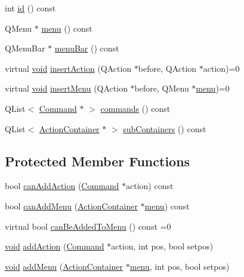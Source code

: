 \begin{DoxyCompactItemize}
\item 
int \hyperlink{group___core_plugin_ga394d3161befa5e1f84cf07253b21a536}{id} () const 
\item 
\-Q\-Menu $\ast$ \hyperlink{group___core_plugin_ga243949a2b2abff30862e34f6313f28c0}{menu} () const 
\item 
\-Q\-Menu\-Bar $\ast$ \hyperlink{group___core_plugin_gaf2d8e7b9ed6b98c22dd1eea1443737ce}{menu\-Bar} () const 
\item 
virtual \hyperlink{group___u_a_v_objects_plugin_ga444cf2ff3f0ecbe028adce838d373f5c}{void} \hyperlink{group___core_plugin_gac4252ea9deafe98c0e98946dfff78b4d}{insert\-Action} (\-Q\-Action $\ast$before, \-Q\-Action $\ast$action)=0
\item 
virtual \hyperlink{group___u_a_v_objects_plugin_ga444cf2ff3f0ecbe028adce838d373f5c}{void} \hyperlink{group___core_plugin_gacc8f86cfc70affa3f17dd0998c9e893b}{insert\-Menu} (\-Q\-Action $\ast$before, \-Q\-Menu $\ast$\hyperlink{group___core_plugin_ga243949a2b2abff30862e34f6313f28c0}{menu})=0
\item 
\-Q\-List$<$ \hyperlink{class_core_1_1_command}{\-Command} $\ast$ $>$ \hyperlink{group___core_plugin_gab3e0ff04d294ddefd25b8762d3e2f008}{commands} () const 
\item 
\-Q\-List$<$ \hyperlink{class_core_1_1_action_container}{\-Action\-Container} $\ast$ $>$ \hyperlink{group___core_plugin_ga63f59fe25c7e6fa20891fca2ee620f16}{sub\-Containers} () const 
\end{DoxyCompactItemize}
\subsection*{\-Protected \-Member \-Functions}
\begin{DoxyCompactItemize}
\item 
bool \hyperlink{group___core_plugin_ga506d6f367240b15d691c878fa0e9935d}{can\-Add\-Action} (\hyperlink{class_core_1_1_command}{\-Command} $\ast$action) const 
\item 
bool \hyperlink{group___core_plugin_gadbde4aa31f9950d994f21baf55bea0ae}{can\-Add\-Menu} (\hyperlink{class_core_1_1_action_container}{\-Action\-Container} $\ast$\hyperlink{group___core_plugin_ga243949a2b2abff30862e34f6313f28c0}{menu}) const 
\item 
virtual bool \hyperlink{group___core_plugin_gad94e8e4c0fa2c17d3de9edb24be32b17}{can\-Be\-Added\-To\-Menu} () const =0
\item 
\hyperlink{group___u_a_v_objects_plugin_ga444cf2ff3f0ecbe028adce838d373f5c}{void} \hyperlink{group___core_plugin_ga7fa37dae076bbf750250911084354f3c}{add\-Action} (\hyperlink{class_core_1_1_command}{\-Command} $\ast$action, int pos, bool setpos)
\item 
\hyperlink{group___u_a_v_objects_plugin_ga444cf2ff3f0ecbe028adce838d373f5c}{void} \hyperlink{group___core_plugin_ga8b0bc3351ea9c87b7e95bac15c82eb52}{add\-Menu} (\hyperlink{class_core_1_1_action_container}{\-Action\-Container} $\ast$\hyperlink{group___core_plugin_ga243949a2b2abff30862e34f6313f28c0}{menu}, int pos, bool setpos)
\end{DoxyCompactItemize}


